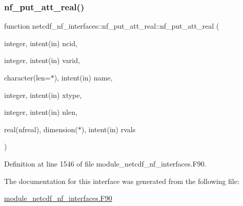 \subsubsection{\texorpdfstring{nf\+\_\+put\+\_\+att\+\_\+real()}{nf\_put\_att\_real()}}
{\footnotesize\ttfamily function netcdf\+\_\+nf\+\_\+interfaces\+::nf\+\_\+put\+\_\+att\+\_\+real\+::nf\+\_\+put\+\_\+att\+\_\+real (\begin{DoxyParamCaption}\item[{integer, intent(in)}]{ncid,  }\item[{integer, intent(in)}]{varid,  }\item[{character(len=$\ast$), intent(in)}]{name,  }\item[{integer, intent(in)}]{xtype,  }\item[{integer, intent(in)}]{nlen,  }\item[{real(nfreal), dimension($\ast$), intent(in)}]{rvals }\end{DoxyParamCaption})}



Definition at line 1546 of file module\+\_\+netcdf\+\_\+nf\+\_\+interfaces.\+F90.



The documentation for this interface was generated from the following file\+:\begin{DoxyCompactItemize}
\item 
\hyperlink{module__netcdf__nf__interfaces_8F90}{module\+\_\+netcdf\+\_\+nf\+\_\+interfaces.\+F90}\end{DoxyCompactItemize}
